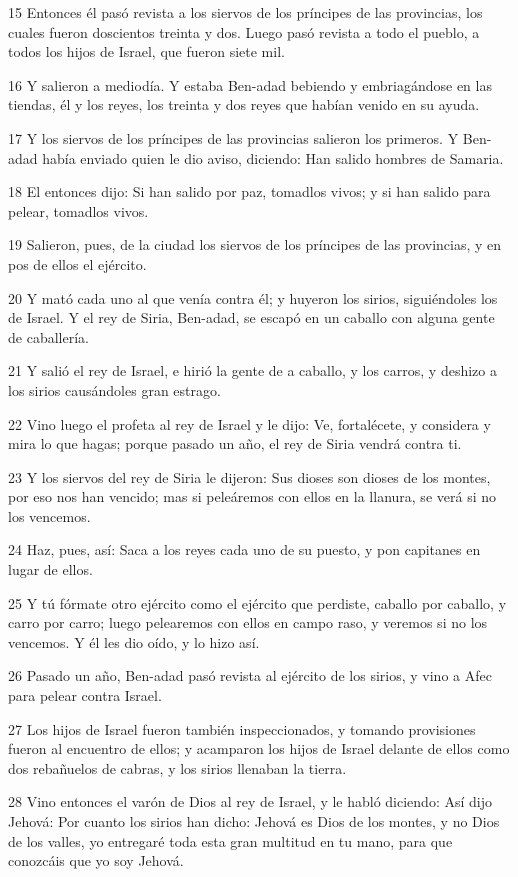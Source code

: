 \par 15 Entonces él pasó revista a los siervos de los príncipes de las provincias, los cuales fueron doscientos treinta y dos. Luego pasó revista a todo el pueblo, a todos los hijos de Israel, que fueron siete mil.
\par 16 Y salieron a mediodía. Y estaba Ben-adad bebiendo y embriagándose en las tiendas, él y los reyes, los treinta y dos reyes que habían venido en su ayuda.
\par 17 Y los siervos de los príncipes de las provincias salieron los primeros. Y Ben-adad había enviado quien le dio aviso, diciendo: Han salido hombres de Samaria.
\par 18 El entonces dijo: Si han salido por paz, tomadlos vivos; y si han salido para pelear, tomadlos vivos.
\par 19 Salieron, pues, de la ciudad los siervos de los príncipes de las provincias, y en pos de ellos el ejército.
\par 20 Y mató cada uno al que venía contra él; y huyeron los sirios, siguiéndoles los de Israel. Y el rey de Siria, Ben-adad, se escapó en un caballo con alguna gente de caballería.
\par 21 Y salió el rey de Israel, e hirió la gente de a caballo, y los carros, y deshizo a los sirios causándoles gran estrago.
\par 22 Vino luego el profeta al rey de Israel y le dijo: Ve, fortalécete, y considera y mira lo que hagas; porque pasado un año, el rey de Siria vendrá contra ti.
\par 23 Y los siervos del rey de Siria le dijeron: Sus dioses son dioses de los montes, por eso nos han vencido; mas si peleáremos con ellos en la llanura, se verá si no los vencemos.
\par 24 Haz, pues, así: Saca a los reyes cada uno de su puesto, y pon capitanes en lugar de ellos.
\par 25 Y tú fórmate otro ejército como el ejército que perdiste, caballo por caballo, y carro por carro; luego pelearemos con ellos en campo raso, y veremos si no los vencemos. Y él les dio oído, y lo hizo así.
\par 26 Pasado un año, Ben-adad pasó revista al ejército de los sirios, y vino a Afec para pelear contra Israel.
\par 27 Los hijos de Israel fueron también inspeccionados, y tomando provisiones fueron al encuentro de ellos; y acamparon los hijos de Israel delante de ellos como dos rebañuelos de cabras, y los sirios llenaban la tierra.
\par 28 Vino entonces el varón de Dios al rey de Israel, y le habló diciendo: Así dijo Jehová: Por cuanto los sirios han dicho: Jehová es Dios de los montes, y no Dios de los valles, yo entregaré toda esta gran multitud en tu mano, para que conozcáis que yo soy Jehová.
